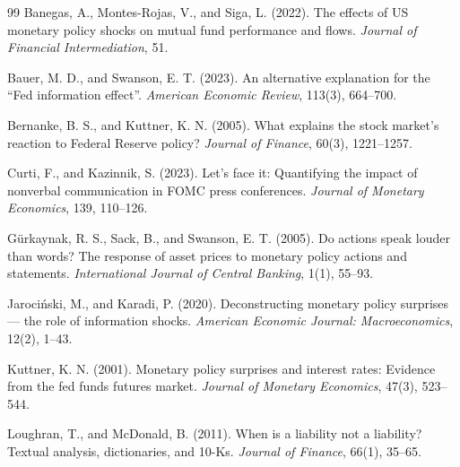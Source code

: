 \documentclass[11pt]{article}
\begin{document}
\begin{thebibliography}{99}
Banegas, A., Montes-Rojas, V., and Siga, L. (2022). The effects of US monetary policy shocks on mutual fund performance and flows. \emph{Journal of Financial Intermediation}, 51.

Bauer, M. D., and Swanson, E. T. (2023). An alternative explanation for the ``Fed information effect''. \emph{American Economic Review}, 113(3), 664--700.

Bernanke, B. S., and Kuttner, K. N. (2005). What explains the stock market's reaction to Federal Reserve policy? \emph{Journal of Finance}, 60(3), 1221--1257.

Curti, F., and Kazinnik, S. (2023). Let's face it: Quantifying the impact of nonverbal communication in FOMC press conferences. \emph{Journal of Monetary Economics}, 139, 110--126.

G\"{u}rkaynak, R. S., Sack, B., and Swanson, E. T. (2005). Do actions speak louder than words? The response of asset prices to monetary policy actions and statements. \emph{International Journal of Central Banking}, 1(1), 55--93.

Jaroci\'{n}ski, M., and Karadi, P. (2020). Deconstructing monetary policy surprises --- the role of information shocks. \emph{American Economic Journal: Macroeconomics}, 12(2), 1--43.

Kuttner, K. N. (2001). Monetary policy surprises and interest rates: Evidence from the fed funds futures market. \emph{Journal of Monetary Economics}, 47(3), 523--544.

Loughran, T., and McDonald, B. (2011). When is a liability not a liability? Textual analysis, dictionaries, and 10-Ks. \emph{Journal of Finance}, 66(1), 35--65.
\end{thebibliography}
\end{document}
